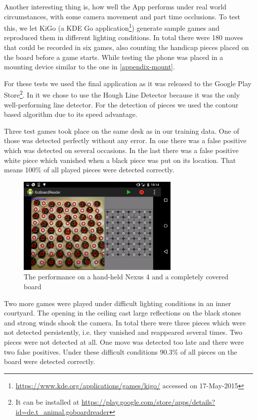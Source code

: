 	Another interesting thing is, how well the App performs under real world circumstances, with some camera movement and part time occlusions. To test this, we let KiGo (a KDE Go application\footnote{\url{https://www.kde.org/applications/games/kigo/} accessed on 17-May-2015}) generate sample games and reproduced them in different lighting conditions. In total there were 180 moves that could be recorded in six games, also counting the handicap pieces placed on the board before a game starts. While testing the phone was placed in a mounting device similar to the one in \autoref{appendix-mount}.

	For these tests we used the final application as it was released to the Google Play Store\footnote{It can be installed at \url{https://play.google.com/store/apps/details?id=de.t_animal.goboardreader}}. In it we chose to use the Hough Line Detector because it was the only well-performing line detector. For the detection of pieces we used the contour based algorithm due to its speed advantage.

	Three test games took place on the same desk as in our training data. One of those was detected perfectly without any error. In one there was a false positive which was detected on several occasions. In the last there was a false positive white piece which vanished when a black piece was put on its location. That means 100\% of all played pieces were detected correctly.

	\begin{figure}[h!]
		\center
		\includegraphics[width=0.7\textwidth]{images/android_perfect_recognition.png}
		\caption{The performance on a hand-held Nexus 4 and a completely covered board}
		\label{fig:android_perfect_recognition}
	\end{figure}
	Two more games were played under difficult lighting conditions in an inner courtyard. The opening in the ceiling cast large reflections on the black stones and strong winds shook the camera. In total there were three pieces which were not detected persistently, i.e. they vanished and reappeared several times. Two pieces were not detected at all. One move was detected too late and there were two false positives. Under these difficult conditions 90.3\% of all pieces on the board were detected correctly.

